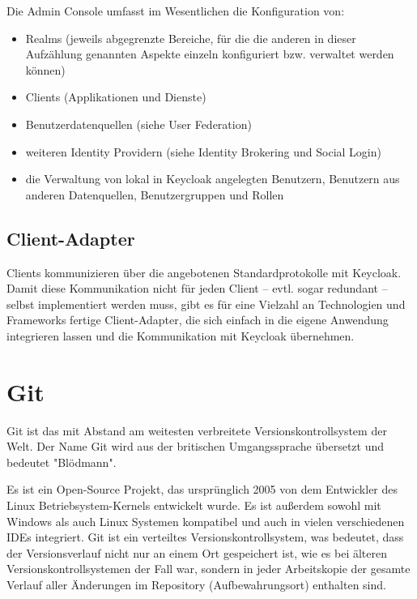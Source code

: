 Die Admin Console umfasst im Wesentlichen die Konfiguration von:
\begin{itemize}
    \item Realms (jeweils abgegrenzte Bereiche, für die die anderen in dieser Aufzählung genannten Aspekte einzeln konfiguriert bzw. verwaltet werden können)
    \item Clients (Applikationen und Dienste)
    \item Benutzerdatenquellen (siehe User Federation)
    \item weiteren Identity Providern (siehe Identity Brokering und Social Login)
    \item die Verwaltung von lokal in Keycloak angelegten Benutzern, Benutzern aus anderen Datenquellen, Benutzergruppen und Rollen
\end{itemize}
\cite{sysarch-keycloak-2}

\subsection{Client-Adapter}

Clients kommunizieren über die angebotenen Standardprotokolle mit Keycloak. Damit diese Kommunikation nicht für jeden Client – evtl. sogar redundant – selbst implementiert werden muss, 
gibt es für eine Vielzahl an Technologien und Frameworks fertige Client-Adapter, die sich einfach in die eigene Anwendung integrieren lassen und die Kommunikation mit Keycloak übernehmen. 
\cite{sysarch-keycloak-2}


\section{Git}

Git ist das mit Abstand am weitesten verbreitete Versionskontrollsystem der Welt. Der Name Git wird aus der britischen 
Umgangssprache übersetzt und bedeutet "Blödmann".
\cite{sysarch-git-1}

Es ist ein Open-Source Projekt, 
das ursprünglich 2005 von dem Entwickler des Linux Betriebsystem-Kernels entwickelt wurde. Es ist außerdem sowohl mit 
Windows als auch Linux Systemen kompatibel und auch in vielen verschiedenen IDEs integriert. Git ist ein verteiltes Versionskontrollsystem, 
was bedeutet, dass der Versionsverlauf nicht nur an einem Ort gespeichert ist, wie es bei älteren Versionskontrollsystemen der Fall war, 
sondern in jeder Arbeitskopie der gesamte Verlauf aller Änderungen im Repository (Aufbewahrungsort) enthalten sind. 
\cite{sysarch-git-2}


